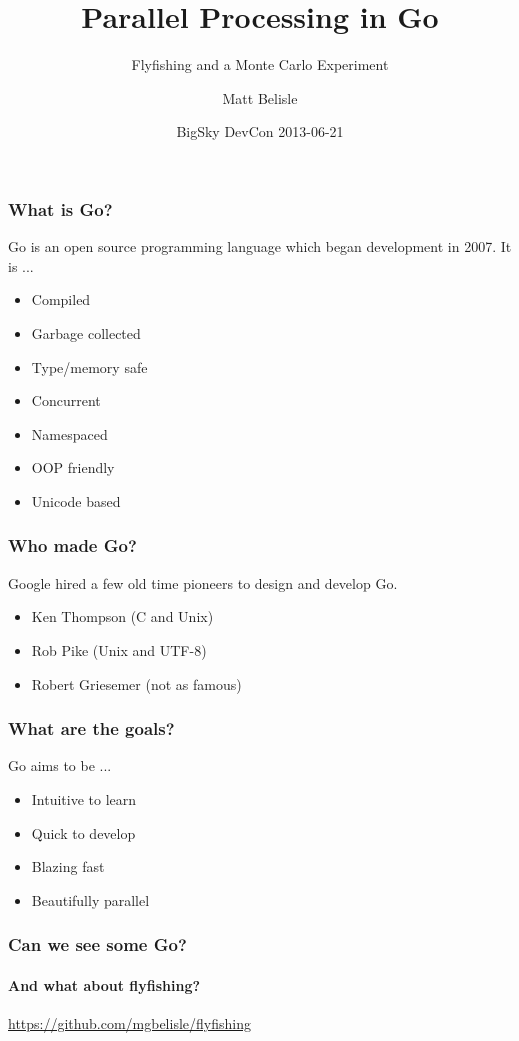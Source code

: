 \documentclass{beamer}
\title{Parallel Processing in Go}
\subtitle{Flyfishing and a Monte Carlo Experiment}
\author{Matt Belisle}
\date{BigSky DevCon 2013-06-21}
\begin{document}
\frame{\titlepage}
\begin{frame}
  \frametitle{What is Go?}

  Go is an open source programming language which began development in
  2007.  It is ...
  
  \begin{itemize}
    \item Compiled
    \item Garbage collected
    \item Type/memory safe
    \item Concurrent
    \item Namespaced
    \item OOP friendly
    \item Unicode based
  \end{itemize}
\end{frame}
\begin{frame}
  \frametitle{Who made Go?}

  Google hired a few old time pioneers to design and develop Go.
  
  \begin{itemize}
    \item Ken Thompson (C and Unix)
    \item Rob Pike (Unix and UTF-8)
    \item Robert Griesemer (not as famous)
  \end{itemize}
\end{frame}
\begin{frame}
  \frametitle{What are the goals?}

  Go aims to be ...
  
  \begin{itemize}
    \item Intuitive to learn
    \item Quick to develop
    \item Blazing fast
    \item Beautifully parallel
  \end{itemize}
\end{frame}
\begin{frame}
  \frametitle{Can we see some Go?}
  \framesubtitle{And what about flyfishing?}
  \begin{center}
    \url{https://github.com/mgbelisle/flyfishing}
  \end{center}
\end{frame}
\end{document}

